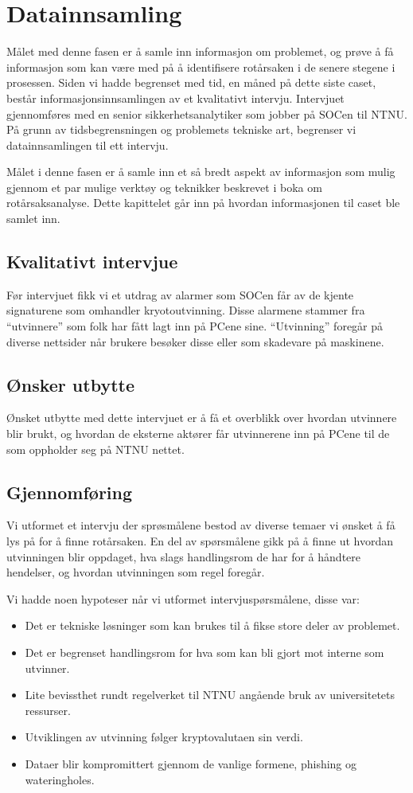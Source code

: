 \chapter{Datainnsamling}
Målet med denne fasen er å samle inn informasjon om problemet, og prøve å få informasjon som kan være med på å identifisere rotårsaken i de senere stegene i prosessen. Siden vi hadde begrenset med tid, en måned på dette siste caset, består informasjonsinnsamlingen av et kvalitativt intervju. Intervjuet gjennomføres med en senior sikkerhetsanalytiker som jobber på SOCen til NTNU. På grunn av tidsbegrensningen og problemets tekniske art, begrenser vi datainnsamlingen til ett intervju.

Målet i denne fasen er å samle inn et så bredt aspekt av informasjon som mulig gjennom et par mulige verktøy og teknikker beskrevet i boka om rotårsaksanalyse\cite{RCA}. Dette kapittelet går inn på hvordan informasjonen til caset ble samlet inn.

\section{Kvalitativt intervjue}
Før intervjuet fikk vi et utdrag av alarmer som SOCen får av de kjente signaturene som omhandler kryotoutvinning. Disse alarmene stammer fra ``utvinnere'' som folk har fått lagt inn på PCene sine. ``Utvinning'' foregår på diverse nettsider når brukere besøker disse \cite{12577042320171101} eller som skadevare på maskinene. 

\section{Ønsker utbytte}
Ønsket utbytte med dette intervjuet er å få et overblikk over hvordan utvinnere blir brukt, og hvordan de eksterne aktører får utvinnerene inn på PCene til de som oppholder seg på NTNU nettet. 

\section{Gjennomføring}
Vi utformet et intervju der sprøsmålene bestod av diverse temaer vi ønsket å få lys på for å finne rotårsaken. En del av spørsmålene gikk på å finne ut hvordan utvinningen blir oppdaget, hva slags handlingsrom de har for å håndtere hendelser, og hvordan utvinningen som regel foregår.

Vi hadde noen hypoteser når vi utformet intervjuspørsmålene, disse var:
\begin{itemize}
    \item Det er tekniske løsninger som kan brukes til å fikse store deler av problemet.
    \item Det er begrenset handlingsrom for hva som kan bli gjort mot interne som utvinner.
    \item Lite bevissthet rundt regelverket til NTNU angående bruk av universitetets ressurser.
    \item Utviklingen av utvinning følger kryptovalutaen sin verdi.
    \item Dataer blir kompromittert gjennom de vanlige formene, phishing og wateringholes.
\end{itemize}

